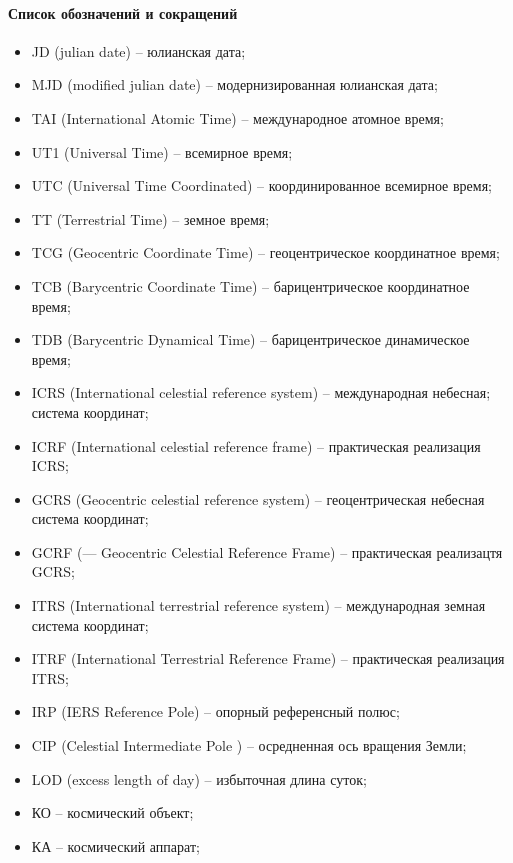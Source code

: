 \paragraph{Список обозначений и сокращений}

\begin{itemize}
    \item JD (julian date) -- юлианская дата;
    \item MJD (modified julian date) -- модернизированная юлианская дата;
    \item TAI (International Atomic Time) -- международное атомное время;
    \item UT1 (Universal Time) -- всемирное время;
    \item UTC (Universal Time Coordinated) -- координированное всемирное время;
    \item TT (Terrestrial Time) -- земное время;
    \item TCG (Geocentric Coordinate Time) -- геоцентрическое координатное время;
    \item TCB (Barycentric Coordinate Time) -- барицентрическое координатное время;
    \item TDB (Barycentric Dynamical Time) -- барицентрическое динамическое время;
    \item ICRS (International celestial reference system) -- международная небесная;
    система координат;
    \item ICRF (International celestial reference
    frame) -- практическая реализация ICRS;
    \item GCRS (Geocentric celestial reference system) -- геоцентрическая небесная
    система координат;
    \item GCRF (— Geocentric Celestial Reference
    Frame) -- практическая реализацтя GCRS;
    \item ITRS (International terrestrial reference system) -- международная земная система координат;
    \item ITRF (International Terrestrial Reference
    Frame) -- практическая реализация ITRS;
    \item IRP (IERS Reference Pole) -- опорный референсный полюс;
    \item CIP (Celestial Intermediate Pole ) -- осредненная ось вращения Земли;
    \item LOD (excess length of day) -- избыточная длина суток;
    \item КО -- космический объект;
    \item КА -- космический аппарат;

\end{itemize}
